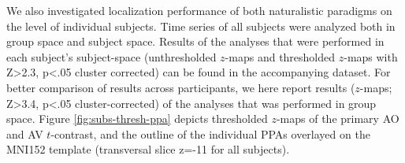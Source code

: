 \documentclass[english]{article}
\begin{document}

We also investigated localization performance of both naturalistic paradigms on
the level of individual subjects.
Time series of all subjects were analyzed both in group space and subject space.
Results of the analyses that were performed in each subject's subject-space
(unthresholded $z$-maps and thresholded $z$-maps with Z>2.3, p<.05 cluster
corrected) can be found in the accompanying dataset.
For better comparison of results across participants, we here report results
($z$-maps; Z>3.4, p<.05 cluster-corrected) of the analyses that was performed in
group space.
Figure \ref{fig:subs-thresh-ppa} depicts thresholded $z$-maps of the primary AO
and AV $t$-contrast, and the outline of the individual PPAs
\citep{sengupta2016extension} overlayed on the MNI152 template (transversal slice z=-11 for all subjects).

\end{document}
